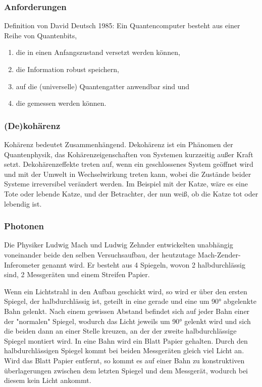 \subsubsection{Anforderungen}

Definition von David Deutsch 1985:
Ein Quantencomputer besteht aus einer Reihe von Quantenbits,
\begin{enumerate}
	\item die in einen Anfangszustand versetzt werden können,
	\item die Information robust speichern,
	\item auf die (universelle) Quantengatter anwendbar sind und
	\item die gemessen werden können.
\end{enumerate}

\subsubsection{(De)kohärenz}

Kohärenz bedeutet Zusammenhängend. Dekohärenz ist ein Phänomen der Quantenphysik, das Kohärenzeigenschaften von Systemen kurzzeitig außer Kraft setzt. Dekohärenzeffekte treten auf, wenn ein geschlossenes System geöffnet wird und mit der Umwelt in Wechselwirkung treten kann, wobei die Zustände beider Systeme irreversibel verändert werden.
Im Beispiel mit der Katze, wäre es eine Tote oder lebende Katze, und der Betrachter, der nun weiß, ob die Katze tot oder lebendig ist.

\subsubsection{Photonen}

Die Physiker Ludwig Mach und Ludwig Zehnder entwickelten unabhängig voneinander beide den selben Versuchsaufbau, der heutzutage Mach-Zender-Inferometer genannt wird. Er besteht aus 4 Spiegeln, wovon 2 halbdurchlässig sind, 2 Messgeräten und einem Streifen Papier.

Wenn ein Lichtstrahl in den Aufbau geschickt wird, so wird er über den ersten Spiegel, der halbdurchlässig ist, geteilt in eine gerade und eine um 90° abgelenkte Bahn gelenkt. Nach einem gewissen Abstand befindet sich auf jeder Bahn einer der "normalen" Spiegel, wodurch das Licht jeweils um 90° gelenkt wird und sich die beiden dann an einer Stelle kreuzen, an der der zweite halbdurchlässige Spiegel montiert wird. In eine Bahn wird ein Blatt Papier gehalten. Durch den halbdurchlässigen Spiegel kommt bei beiden Messgeräten gleich viel Licht an. Wird das Blatt Papier entfernt, so kommt es auf einer Bahn zu konstruktiven überlagerungen zwischen dem letzten Spiegel und dem Messgerät, wodurch bei diesem kein Licht ankommt.

